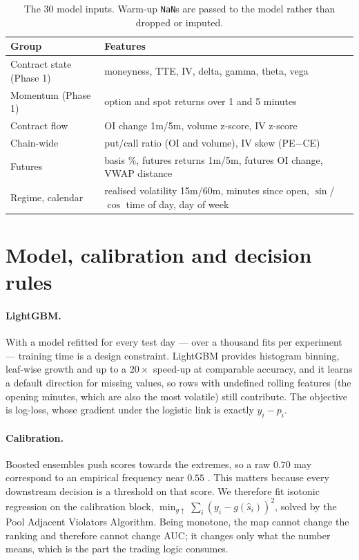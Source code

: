 \documentclass[10pt,a4paper]{article}
\newcommand{\code}[1]{\texttt{#1}}
\begin{document}
\begin{table}[H]
\centering\small
\begin{tabular}{@{}lp{11.4cm}@{}}
\toprule
\textbf{Group} & \textbf{Features}\\
\midrule
Contract state (Phase 1) & moneyness, TTE, IV, delta, gamma, theta, vega\\
Momentum (Phase 1) & option and spot returns over 1 and 5 minutes\\
Contract flow & OI change 1m/5m, volume z-score, IV z-score\\
Chain-wide & put/call ratio (OI and volume), IV skew (PE$-$CE)\\
Futures & basis \%, futures returns 1m/5m, futures OI change, VWAP distance\\
Regime, calendar & realised volatility 15m/60m, minutes since open,
$\sin$/$\cos$ time of day, day of week\\
\bottomrule
\end{tabular}
\caption{The 30 model inputs. Warm-up \code{NaN}s are passed to the model
rather than dropped or imputed.}
\label{tab:features}
\end{table}

\section{Model, calibration and decision rules}\label{sec:model}

\paragraph{LightGBM.} With a model refitted for every test day --- over a
thousand fits per experiment --- training time is a design constraint. LightGBM
\cite{lightgbm} provides histogram binning, leaf-wise growth and up to a
$20\times$ speed-up at comparable accuracy, and it learns a default direction
for missing values, so rows with undefined rolling features (the opening
minutes, which are also the most volatile) still contribute. The objective is
log-loss, whose gradient under the logistic link is exactly $y_i-p_i$.

\paragraph{Calibration.} Boosted ensembles push scores towards the extremes, so
a raw $0.70$ may correspond to an empirical frequency near $0.55$
\cite{sklearncalib}. This matters because every downstream decision is a
threshold on that score. We therefore fit isotonic regression \cite{zadrozny}
on the calibration block,
$\min_{g \uparrow} \sum_i (y_i - g(\hat{s}_i))^2$,
solved by the Pool Adjacent Violators Algorithm. Being monotone, the map cannot
change the ranking and therefore cannot change AUC; it changes only what the
number means, which is the part the trading logic consumes.
\end{document}
